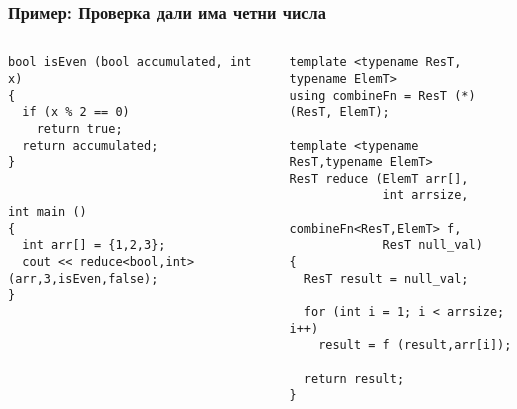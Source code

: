 \documentclass{beamer}
\begin{document}
\begin{frame}[fragile]
\frametitle{Пример: Проверка дали има четни числа}


\begin{columns}[t]
  \begin{column}{0.55\textwidth}

\begin{flushleft}
\begin{lstlisting}
bool isEven (bool accumulated, int x)
{
  if (x % 2 == 0)
    return true;
  return accumulated;
}


int main ()
{
  int arr[] = {1,2,3};
  cout << reduce<bool,int> (arr,3,isEven,false);
}

\end{lstlisting}  
\end{flushleft}
  \end{column}
  \begin{column}{0.45\textwidth}
\begin{flushleft}
\vspace{-30px}
\begin{lstlisting}
template <typename ResT, typename ElemT>
using combineFn = ResT (*) (ResT, ElemT);

template <typename ResT,typename ElemT>
ResT reduce (ElemT arr[], 
             int arrsize, 
             combineFn<ResT,ElemT> f, 
             ResT null_val)
{
  ResT result = null_val;

  for (int i = 1; i < arrsize; i++)
    result = f (result,arr[i]);

  return result;
}
\end{lstlisting}  
\end{flushleft}

  \end{column}
\end{columns}


\end{frame}
\end{document}
